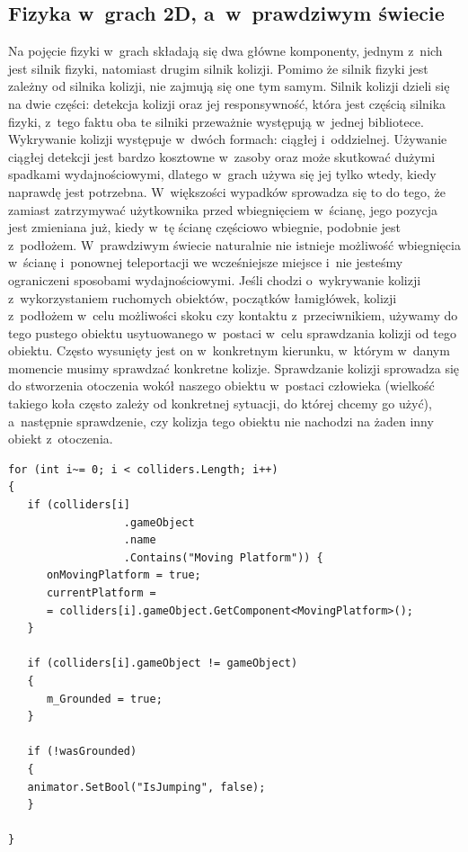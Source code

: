 \documentclass[oneside,polski,logo]{amuthesis}
\begin{document}
\subsection{Fizyka w~grach 2D, a~w~prawdziwym świecie}
Na pojęcie fizyki w~grach składają się dwa główne komponenty, jednym z~nich jest silnik fizyki, natomiast drugim silnik kolizji. Pomimo że silnik fizyki jest zależny od silnika kolizji, nie zajmują się one tym samym.
Silnik kolizji dzieli się na dwie części: detekcja kolizji oraz jej responsywność, która jest częścią silnika fizyki, z~tego faktu oba te silniki przeważnie występują w~jednej bibliotece. Wykrywanie kolizji występuje w~dwóch formach: ciągłej i~oddzielnej. Używanie ciągłej detekcji jest bardzo kosztowne w~zasoby oraz może skutkować dużymi spadkami wydajnościowymi, dlatego w~grach używa się jej tylko wtedy, kiedy naprawdę jest potrzebna. W~większości wypadków sprowadza się to do tego, że zamiast zatrzymywać użytkownika przed wbiegnięciem w~ścianę, jego pozycja jest zmieniana już, kiedy w~tę ścianę częściowo wbiegnie, podobnie jest z~podłożem. W~prawdziwym świecie naturalnie nie istnieje możliwość wbiegnięcia w~ścianę i~ponownej teleportacji we wcześniejsze miejsce i~nie jesteśmy ograniczeni sposobami wydajnościowymi. Jeśli chodzi o~wykrywanie kolizji z~wykorzystaniem ruchomych obiektów, początków łamigłówek, kolizji z~podłożem w~celu możliwości skoku czy kontaktu z~przeciwnikiem, używamy do tego pustego obiektu usytuowanego w~postaci w~celu sprawdzania kolizji od tego obiektu. Często wysunięty jest on w~konkretnym kierunku, w~którym w~danym momencie musimy sprawdzać konkretne kolizje. Sprawdzanie kolizji sprowadza się do stworzenia otoczenia wokół naszego obiektu w~postaci człowieka (wielkość takiego koła często zależy od konkretnej sytuacji, do której chcemy go użyć), a~następnie sprawdzenie, czy kolizja tego obiektu nie nachodzi na żaden inny obiekt z~otoczenia. \cite{physics1}


\begin{lstlisting}[breaklines=true,
language={[Sharp]C},
rulecolor=\color{blue!80!black},
caption={Fragment klasy \texttt{CharacterController.cs}}
]
for (int i~= 0; i < colliders.Length; i++)
{
   if (colliders[i]
                  .gameObject
                  .name
                  .Contains("Moving Platform")) {
      onMovingPlatform = true;
      currentPlatform = 
      = colliders[i].gameObject.GetComponent<MovingPlatform>();
   }

   if (colliders[i].gameObject != gameObject)
   {
      m_Grounded = true;
   }

   if (!wasGrounded)
   {
   animator.SetBool("IsJumping", false);
   }

}
\end{lstlisting}
\end{document}
